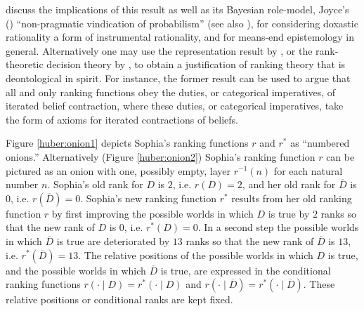 \citet{beh} discuss the implications of this result as well as its Bayesian role-model, Joyce's () ``non-pragmatic vindication of probabilism'' (see also \citealt{p11,p13}), for considering doxastic rationality a form of instrumental rationality, and for means-end epistemology in general. Alternatively one may use the representation result by \citet{hs08}, or the rank-theoretic decision theory by \citet{gs00}, to obtain a justification of ranking theory that is deontological in spirit. For instance, the former result can be used to argue that all and only ranking functions obey the duties, or categorical imperatives, of iterated belief contraction, where these duties, or categorical imperatives, take the form of axioms for iterated contractions of beliefs.

Figure \ref{huber:onion1} depicts Sophia's ranking functions $r$ and $r^*$ as ``numbered onions.'' Alternatively (Figure \ref{huber:onion2}) Sophia's ranking function $r$ can be pictured as an onion with one, possibly empty, layer $r^{-1}\left(n\right)$ for each natural number $n$. Sophia's old rank for $D$ is $2$, i.e. $r\left(D\right)=2$, and her old rank for $\overline{D}$ is $0$, i.e. $r\left(\overline{D}\right)=0$. Sophia's new ranking function $r^*$ results from her old ranking function $r$ by first improving the possible worlds in which $D$ is true by $2$ ranks so that the new rank of $D$ is $0$, i.e. $r^*\left(D\right)=0$. In a second step the possible worlds in which $\overline{D}$ is true are deteriorated by $13$ ranks so that the new rank of $\overline{D}$ is $13$, i.e. $r^*\left(\overline{D}\right)=13$. The relative positions of the possible worlds in which $D$ is true, and the possible worlds in which $\overline{D}$ is true, are expressed in the conditional ranking functions $r\left(\cdot\mid D\right)=r^*\left(\cdot\mid D\right)$ and $r\left(\cdot\mid\overline{D}\right)=r^*\left(\cdot\mid\overline{D}\right)$. These relative positions or conditional ranks are kept fixed.

